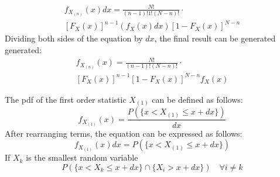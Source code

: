 \documentclass[conference]{IEEEtran}
\begin{document}
\begin{equation}
\begin{gathered}
f_{X_{(n)}}(x)dx=\frac{N!}{(n-1)!1!(N-n)!}\cdot\\
[F_X(x)]^{n-1}(f_X(x)dx)[1-F_X(x)]^{N-n}
\end{gathered}
\end{equation}
Dividing both sides of the equation by $dx$, the final result can be generated generated:
\begin{equation}
\begin{gathered}
f_{X_{(n)}}(x)=\frac{N!}{(n-1)!(N-n)!}\cdot\\
[F_X(x)]^{n-1}[1-F_X(x)]^{N-n}f_X(x)
\end{gathered}
\end{equation}


The pdf of the first order statistic $X_{(1)}$ can be defined as follows:
\begin{equation}
f_{X_{(1)}}(x)=\frac{P(\{x < X_{(1)} \leq x+dx\})}{dx}
\end{equation}
After rearranging terms, the equation can be expressed as follows:
\begin{equation}
f_{X_{(1)}}(x)dx=P(\{x < X_{(1)} \leq x+dx\})
\end{equation}
If $X_k$ is the smallest random variable 
\begin{equation}
P(\{x < X_k \leq x+dx\} \cap \{X_i > x+dx\}) \quad \forall i \neq k 
\end{equation}
\end{document}
